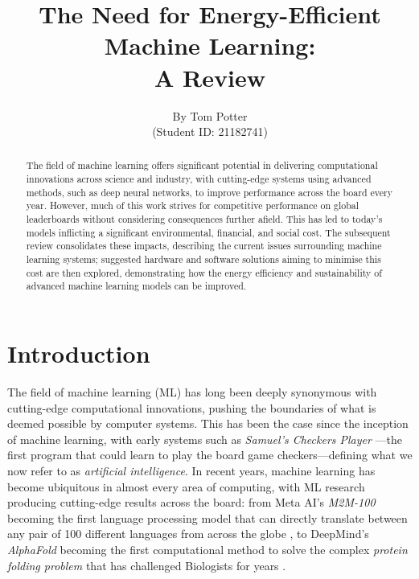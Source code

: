 \documentclass[a4paper, 12pt]{article}
\title{The Need for Energy-Efficient Machine Learning: \\ A Review}
\author{By Tom Potter \\ (Student ID: 21182741)}
\date{}
\begin{document}
    
    \maketitle

    \begin{abstract}
        The field of machine learning offers significant potential in delivering computational innovations across science and industry, with cutting-edge systems using advanced methods, such as deep neural networks, to improve performance across the board every year. However, much of this work strives for competitive performance on global leaderboards without considering consequences further afield. This has led to today's models inflicting a significant environmental, financial, and social cost. The subsequent review consolidates these impacts, describing the current issues surrounding machine learning systems; suggested hardware and software solutions aiming to minimise this cost are then explored, demonstrating how the energy efficiency and sustainability of advanced machine learning models can be improved.
    \end{abstract}

    \newpage
    \tableofcontents
    \newpage

    \section{Introduction}

    The field of machine learning (ML) has long been deeply synonymous with cutting-edge computational innovations, pushing the boundaries of what is deemed possible by computer systems. This has been the case since the inception of machine learning, with early systems such as \emph{Samuel's Checkers Player} \cite{samuel-1959}---the first program that could learn to play the board game checkers---defining what we now refer to as \emph{artificial intelligence}. In recent years, machine learning has become ubiquitous in almost every area of computing, with ML research producing cutting-edge results across the board: from Meta AI's \emph{M2M-100} becoming the first language processing model that can directly translate between any pair of 100 different languages from across the globe \cite{fan-2020a}, to DeepMind's \emph{AlphaFold} becoming the first computational method to solve the complex \emph{protein folding problem} that has challenged Biologists for years \cite{jumper-2021}. 
\end{document}
